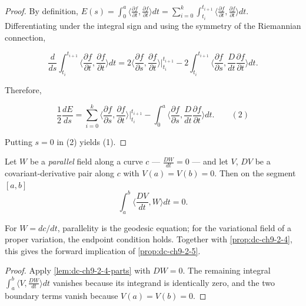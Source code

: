 \begin{proof}
  \sketch
  By definition,
  $E(s)=\int_0^a\langle\frac{\partial f}{\partial t},\frac{\partial f}{\partial t}\rangle dt=\sum_{i=0}^k\int_{t_i}^{t_{i+1}}\langle\frac{\partial f}{\partial t},\frac{\partial f}{\partial t}\rangle dt$.
  Differentiating under the integral sign and using the symmetry of the Riemannian
  connection,

  $$
  \frac{d}{ds}\int_{t_i}^{t_{i+1}}\Big\langle\frac{\partial f}{\partial t},\frac{\partial f}{\partial t}\Big\rangle dt=2\Big\langle\frac{\partial f}{\partial s},\frac{\partial f}{\partial t}\Big\rangle\Big|_{t_i}^{t_{i+1}}-2\int_{t_i}^{t_{i+1}}\Big\langle\frac{\partial f}{\partial s},\frac{D}{dt}\frac{\partial f}{\partial t}\Big\rangle dt.
  $$

  Therefore,

  $$
  \frac{1}{2}\frac{dE}{ds}=\sum_{i=0}^k\Big\langle\frac{\partial f}{\partial s},\frac{\partial f}{\partial t}\Big\rangle\Big|_{t_i}^{t_{i+1}}-\int_0^a\Big\langle\frac{\partial f}{\partial s},\frac{D}{dt}\frac{\partial f}{\partial t}\Big\rangle dt.\qquad(2)
  $$

  Putting $s=0$ in (2) yields (1).
\end{proof}
\begin{lemma}
  \label{lem:dc-ch9-2-5-geodesic}
  \leanok
  Let $W$ be a \emph{parallel} field along a curve $c$ --- $\frac{DW}{dt}=0$ --- and let
  $V$, $DV$ be a covariant-derivative pair along $c$ with $V(a)=V(b)=0$. Then on the
  segment $[a,b]$
  $$
  \int_a^b\Big\langle\frac{DV}{dt},W\Big\rangle dt=0.
  $$

  For $W=dc/dt$, parallelity is the geodesic equation; for the variational
  field of a proper variation, the endpoint condition holds. Together with
  \cref{prop:dc-ch9-2-4}, this gives the forward implication of
  \cref{prop:dc-ch9-2-5}.
\end{lemma}
\begin{proof}
  \leanok
  \sketch
  Apply \cref{lem:dc-ch9-2-4-parts} with $DW=0$. The remaining integral
  $\int_a^b\langle V,\frac{DW}{dt}\rangle dt$ vanishes because its integrand is
  identically zero, and the two boundary terms vanish because $V(a)=V(b)=0$.
\end{proof}
